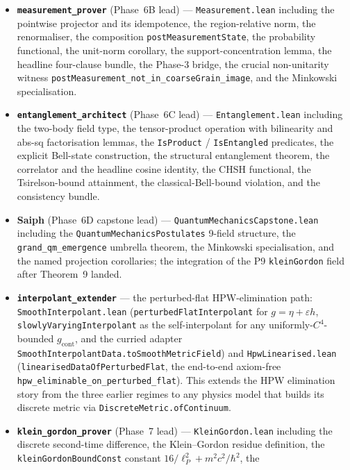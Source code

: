 \documentclass[11pt,a4paper,twoside]{article}
\theoremstyle{definition}
\newcommand{\lP}{\ell_P}
\newcommand{\code}[1]{\texttt{#1}}
\begin{document}
\begin{itemize}
  uncertainty theorem, and the final position-momentum theorem.
\item \textbf{\code{measurement\_prover}} (Phase~6B lead) ---
  \code{Measurement.lean} including the pointwise projector and its
  idempotence, the region-relative norm, the renormaliser, the
  composition \code{postMeasurementState}, the probability
  functional, the unit-norm corollary, the support-concentration
  lemma, the headline four-clause bundle, the Phase-3 bridge, the
  crucial non-unitarity witness
  \code{postMeasurement\_not\_in\_coarseGrain\_image}, and the
  Minkowski specialisation.
\item \textbf{\code{entanglement\_architect}} (Phase~6C lead) ---
  \code{Entanglement.lean} including the two-body field type, the
  tensor-product operation with bilinearity and abs-sq factorisation
  lemmas, the \code{IsProduct} / \code{IsEntangled} predicates, the
  explicit Bell-state construction, the structural entanglement
  theorem, the correlator and the headline cosine identity, the CHSH
  functional, the Tsirelson-bound attainment, the classical-Bell-bound
  violation, and the consistency bundle.
\item \textbf{Saiph} (Phase~6D capstone lead) ---
  \code{QuantumMechanicsCapstone.lean} including the
  \code{QuantumMechanicsPostulates} 9-field structure, the
  \code{grand\_qm\_emergence} umbrella theorem, the Minkowski
  specialisation, and the named projection corollaries; the
  integration of the P9 \code{kleinGordon} field after Theorem~9
  landed.
\item \textbf{\code{interpolant\_extender}} --- the
  perturbed-flat HPW-elimination path:
  \code{SmoothInterpolant.lean} (\code{perturbedFlatInterpolant} for
  $g = \eta + \varepsilon h$, \code{slowlyVaryingInterpolant} as the
  self-interpolant for any uniformly-$C^{4}$-bounded
  $g_{\mathrm{cont}}$, and the curried adapter
  \code{SmoothInterpolantData.toSmoothMetricField}) and
  \code{HpwLinearised.lean}
  (\code{linearisedDataOfPerturbedFlat}, the end-to-end axiom-free
  \code{hpw\_eliminable\_on\_perturbed\_flat}). This extends the HPW
  elimination story from the three earlier regimes to any physics
  model that builds its discrete metric via
  \code{DiscreteMetric.ofContinuum}.
\item \textbf{\code{klein\_gordon\_prover}} (Phase~7 lead) ---
  \code{KleinGordon.lean} including the discrete second-time
  difference, the Klein--Gordon residue definition, the
  \code{kleinGordonBoundConst} constant
  $16/\lP^{2} + m^{2}c^{2}/\hbar^{2}$, the

\end{itemize}
\end{document}
